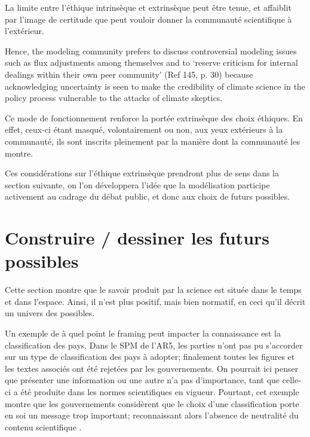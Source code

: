 La limite entre l'éthique intrinsèque et extrinsèque peut être tenue, et affaiblit par l'image de certitude que peut vouloir donner la communauté scientifique à l'extérieur. 

\begin{authoredquote}
    Hence, the modeling community prefers to discuss controversial modeling issues such as flux adjustments among themselves and to ‘reserve criticism for internal dealings within their own peer community’ (Ref 145, p. 30) because acknowledging uncertainty is seen to make the credibility of climate science in the policy process vulnerable to the attacks of climate skeptics.
\end{authoredquote}

Ce mode de fonctionnement renforce la portée extrinsèque des choix éthiques. En effet, ceux-ci étant masqué, volontairement ou non, aux yeux extérieurs à la communauté, ils sont inscrits pleinement par la manière dont la communauté les montre. 

 Ces considérations sur l'éthique extrinsèque prendront plus de sens dans la section suivante, on l'on développera l'idée que la modélisation participe activement au cadrage du débat public, et donc aux choix de futurs possibles. 

\section{Construire / dessiner les futurs possibles}

Cette section montre que le savoir produit par la science est située dans le temps et dans l'espace. Ainsi, il n'est plus positif, mais bien normatif, en ceci qu'il décrit un univers des possibles. 

Un exemple de à quel point le framing peut impacter la connaissance est la classification des pays. Dans le SPM de l'AR5, les parties n'ont pas pu s'accorder sur un type de classification des pays à adopter; finalement toutes les figures et les textes associés ont été rejetées par les gouvernements. On pourrait ici penser que présenter une information ou une autre n'a pas d'importance, tant que celle-ci a été produite dans les normes scientifiques en vigueur. Pourtant, cet exemple montre que les gouvernements considèrent que le choix d'une classification porte en soi un message trop important; reconnaissant alors l'absence de neutralité du contenu scientifique \autocite{edenhofer_mapmakers_2014}. 

